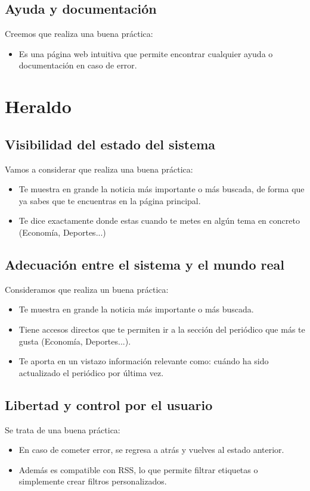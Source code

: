 \documentclass[openany,overnay,a4paper, twoside, 14pt]{book}
\begin{document}
\section*{Ayuda y documentación}
Creemos que realiza una buena práctica:
\begin{itemize}
    \item Es una página web intuitiva que permite encontrar cualquier ayuda o documentación en caso de error.
\end{itemize}
\setcounter{chapter}{4}
\chapter*{Heraldo}
\setcounter{section}{0}
\section*{Visibilidad del estado del sistema}
Vamos a considerar que realiza una buena práctica:
\begin{itemize}
\item Te muestra en grande la noticia más importante o más buscada, de forma que ya sabes que te encuentras en la página principal.
\item Te dice exactamente donde estas cuando te metes en algún tema en concreto (Economía, Deportes...)
\end{itemize}
\section*{Adecuación entre el sistema y el mundo real}
Consideramos que realiza un buena práctica:
\begin{itemize}
\item Te muestra en grande la noticia más importante o más buscada.
\item Tiene accesos directos que te permiten ir a la sección del periódico que más te gusta (Economía, Deportes...).
\item Te aporta en un vistazo información relevante como: cuándo ha sido actualizado el periódico por última vez.
\end{itemize}

\section*{Libertad y control por el usuario}
Se trata de una buena práctica:
\begin{itemize}
\item En caso de cometer error, se regresa a atrás y vuelves al estado anterior.
\item Además es compatible con RSS, lo que permite filtrar etiquetas o simplemente crear filtros personalizados.
\end{itemize}
\end{document}
